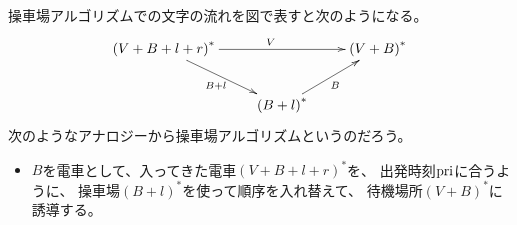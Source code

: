 {	操車場アルゴリズムでの文字の流れを図で表すと次のようになる。
	\begin{equation*}\begin{split}
		\xymatrix{
			\plr{V+B+l+r}^* \ar[rr]^{V} \ar[rd]_{B+l} & & \plr{V+B}^* \\
			& \plr{B+l}^* \ar[ru]_{B}
		}
	\end{split}\end{equation*}
	次のようなアナロジーから操車場アルゴリズムというのだろう。
	\begin{itemize}\setlength{\itemsep}{-1mm} %
		\item $B$を電車として、入ってきた電車$(V+B+l+r)^*$を、
		出発時刻$\mathinner{\operatorname{pri}}$に合うように、
		操車場$(B+l)^*$を使って順序を入れ替えて、
		待機場所$(V+B)^*$に誘導する。
	\end{itemize} %

%
}\endgroup %
